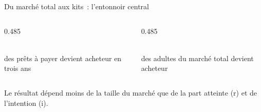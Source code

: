 \begin{frame}{Du marché total aux kits~: l'entonnoir central}
  \vspace{0.05cm}
  \begin{columns}[T]
    \begin{column}{0.485\textwidth}
      \begin{carte}[height=0.95cm,valign=top,colback=insarose]
        \raggedright{}\\[1pt]{\footnotesize des prêts à payer devient acheteur en trois ans}
      \end{carte}
    \end{column}
    \begin{column}{0.485\textwidth}
      \begin{carte}[height=0.95cm,valign=top]
        \raggedright{}\\[1pt]{\footnotesize des adultes du marché total devient acheteur}
      \end{carte}
    \end{column}
  \end{columns}
  \vspace{0.05cm}
  \begin{pcompact}\centering\footnotesize
    Le résultat dépend moins de la taille du marché que de la part atteinte (r) et de l'intention (i).
  \end{pcompact}
\end{frame}


